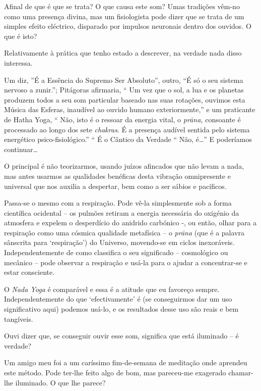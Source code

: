 \smallskip

 Afinal de que é que se trata? O que causa este som? Umas tradições
vêm-no como uma presença divina, mas um fisiologista pode dizer que se
trata de um simples efeito eléctrico, disparado por impulsos neuronais
dentro dos ouvidos. O que é isto?

 Relativamente à prática que tenho estado a descrever, na verdade nada
disso interessa.

Um diz, ''É a Essência do Supremo Ser Absoluto'', outro, ``É só o seu
sistema nervoso a zunir.''; Pitágoras afirmaria, `` Um vez que o sol, a
lua e os planetas produzem todos a seu som particular baseado nas suas
rotações, ouvimos esta Música das Esferas, inaudível ao ouvido humano
exteriormente,'' e um praticante de Hatha Yoga, `` Não, isto é o ressoar
da energia vital, o \emph{prāna,} consoante é processado ao longo dos
sete \emph{chakras}. É a presença audível sentida pelo sistema
energético psico-fisiológico.'' `` É o Cântico da Verdade `` Não,
é\ldots{}'' E poderíamos continuar\ldots{}

O principal é não teorizarmos, usando juízos afincados que não levam a
nada, mas antes usarmos as qualidades benéficas desta vibração
omnipresente e universal que nos auxilia a despertar, bem como a ser
sábios e pacíficos.

Passa-se o mesmo com a respiração. Pode vê-la simplesmente sob a forma
científica ocidental -- os pulmões retiram a energia necessária do
oxigénio da atmosfera e expelem o desperdício do anidrido carbónico -,
ou então, olhar para a respiração como uma cósmica qualidade metafísica
-- o \emph{prāna} (que é a palavra sânscrita para `respiração') do
Universo, movendo-se em ciclos inexoráveis. Independentemente de como
classifica o seu significado -- cosmológico ou mecânico -- pode observar
a respiração e usá-la para o ajudar a concentrar-se e estar consciente.

O \emph{Nada Yoga} é comparável e essa é a atitude que eu favoreço
sempre. Independentemente do que `efectivamente' é (se conseguirmos dar
um uso significativo aqui) podemos usá-lo, e os resultados desse uso são
reais e bem tangíveis.

\smallskip

 Ouvi dizer que, se conseguir ouvir esse som, significa que está
iluminado -- é verdade?

Um amigo meu foi a um caríssimo fim-de-semana de meditação onde aprendeu
este método. Pode ter-lhe feito algo de bom, mas pareceu-me exagerado
chamar-lhe iluminado. O que lhe parece?

